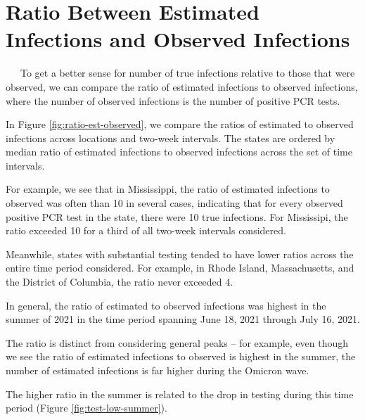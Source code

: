 \documentclass[12pt,twoside]{smiththesis}
\begin{document}
\hypertarget{ratio-between-estimated-infections-and-observed-infections}{%
\section{Ratio Between Estimated Infections and Observed Infections}\label{ratio-between-estimated-infections-and-observed-infections}}

~~~To get a better sense for number of true infections relative to those that were observed, we can compare the ratio of estimated infections to observed infections, where the number of observed infections is the number of positive PCR tests.

In Figure \ref{fig:ratio-est-observed}, we compare the ratios of estimated to observed infections across locations and two-week intervals. The states are ordered by median ratio of estimated infections to observed infections across the set of time intervals.

For example, we see that in Mississippi, the ratio of estimated infections to observed was often than 10 in several cases, indicating that for every observed positive PCR test in the state, there were 10 true infections. For Mississipi, the ratio exceeded 10 for a third of all two-week intervals considered.

Meanwhile, states with substantial testing tended to have lower ratios across the entire time period considered. For example, in Rhode Island, Massachusetts, and the District of Columbia, the ratio never exceeded 4.

In general, the ratio of estimated to observed infections was highest in the summer of 2021 in the time period spanning June 18, 2021 through July 16, 2021.

The ratio is distinct from considering general peaks -- for example, even though we see the ratio of estimated infections to observed is highest in the summer, the number of estimated infections is far higher during the Omicron wave.

The higher ratio in the summer is related to the drop in testing during this time period (Figure \ref{fig:test-low-summer}).

~

~

~

~

~

~

~

~

~
\end{document}
